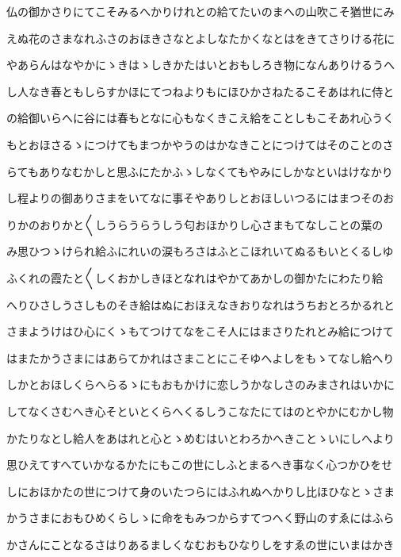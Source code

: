 \documentclass[a4paper,11pt,landscape]{ltjtarticle}
\begin{document}
\par\medskip
仏の御かさりにてこそみるへかりけれとの給てたいのまへの山吹こそ猶世にみ
\par\medskip
えぬ花のさまなれふさのおほきさなとよしなたかくなとはをきてさりける花に
\par\medskip
やあらんはなやかにゝきはゝしきかたはいとおもしろき物になんありけるうへ
\par\medskip
し人なき春ともしらすかほにてつねよりもにほひかさねたるこそあはれに侍と
\par\medskip
の給御いらへに谷には春もとなに心もなくきこえ給をことしもこそあれ心うく
\par\medskip
もとおほさるゝにつけてもまつかやうのはかなきことにつけてはそのことのさ
\par\medskip
らてもありなむかしと思ふにたかふゝしなくてもやみにしかなといはけなかり
\par\medskip
し程よりの御ありさまをいてなに事そやありしとおほしいつるにはまつそのお
\par\medskip
りかのおりかと〱しうらうらうしう匂おほかりし心さまもてなしことの葉の
\par\medskip
み思ひつゝけられ給ふにれいの涙もろさはふとこほれいてぬるもいとくるしゆ
\par\medskip
ふくれの霞たと〱しくおかしきほとなれはやかてあかしの御かたにわたり給
\par\medskip
へりひさしうさしものそき給はぬにおほえなきおりなれはうちおとろかるれと
\par\medskip
さまようけはひ心にくゝもてつけてなをこそ人にはまさりたれとみ給につけて
\par\medskip
はまたかうさまにはあらてかれはさまことにこそゆへよしをもゝてなし給へり
\par\medskip
しかとおほしくらへらるゝにもおもかけに恋しうかなしさのみまされはいかに
\par\medskip
してなくさむへき心そといとくらへくるしうこなたにてはのとやかにむかし物
\par\medskip
かたりなとし給人をあはれと心とゝめむはいとわろかへきことゝいにしへより
\par\medskip
思ひえてすへていかなるかたにもこの世にしふとまるへき事なく心つかひをせ
\par\medskip
しにおほかたの世につけて身のいたつらにはふれぬへかりし比ほひなとゝさま
\par\medskip
かうさまにおもひめくらしゝに命をもみつからすてつへく野山のすゑにはふら
\par\medskip
かさんにことなるさはりあるましくなむおもひなりしをすゑの世にいまはかき
\end{document}
